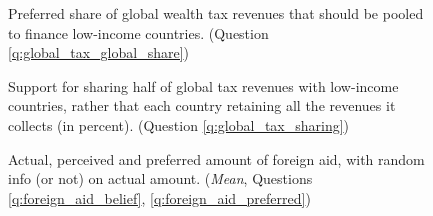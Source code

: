 \begin{figure}[h!]
    \caption[Preferred share of global tax for low-income countries]{Preferred share of global wealth tax revenues that should be pooled to finance low-income countries. (Question \ref{q:global_tax_global_share})}\label{fig:global_tax_global_share}
\end{figure}

\begin{figure}[h!]
    \caption[Support for sharing half of global tax revenues with low-income countries]{Support for sharing half of global tax revenues with low-income countries, rather that each country retaining all the revenues it collects (in percent). (Question \ref{q:global_tax_sharing})}\label{fig:global_tax_sharing}
\end{figure}

\begin{figure} 
    \caption[Actual, perceived and preferred amount of foreign aid (mean)]{Actual, perceived and preferred amount of foreign aid, with random info (or not) on actual amount. (\textit{Mean}, Questions \ref{q:foreign_aid_belief}, \ref{q:foreign_aid_preferred})}\label{fig:foreign_aid_amount}
\end{figure}

